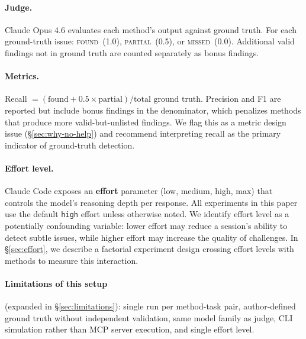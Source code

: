 \documentclass[11pt]{article}
\begin{document}
\paragraph{Judge.} Claude Opus 4.6 evaluates each method's output against ground truth. For each ground-truth issue: \textsc{found}~(1.0), \textsc{partial}~(0.5), or \textsc{missed}~(0.0). Additional valid findings not in ground truth are counted separately as bonus findings.

\paragraph{Metrics.} Recall $= (\text{found} + 0.5 \times \text{partial}) / \text{total ground truth}$. Precision and F1 are reported but include bonus findings in the denominator, which penalizes methods that produce more valid-but-unlisted findings. We flag this as a metric design issue (\S\ref{sec:why-no-help}) and recommend interpreting recall as the primary indicator of ground-truth detection.

\paragraph{Effort level.} Claude Code exposes an \textbf{effort} parameter (low, medium, high, max) that controls the model's reasoning depth per response. All experiments in this paper use the default \texttt{high} effort unless otherwise noted. We identify effort level as a potentially confounding variable: lower effort may reduce a session's ability to detect subtle issues, while higher effort may increase the quality of challenges. In \S\ref{sec:effort}, we describe a factorial experiment design crossing effort levels with methods to measure this interaction.

\paragraph{Limitations of this setup} (expanded in \S\ref{sec:limitations}): single run per method-task pair, author-defined ground truth without independent validation, same model family as judge, CLI simulation rather than MCP server execution, and single effort level.
\end{document}
